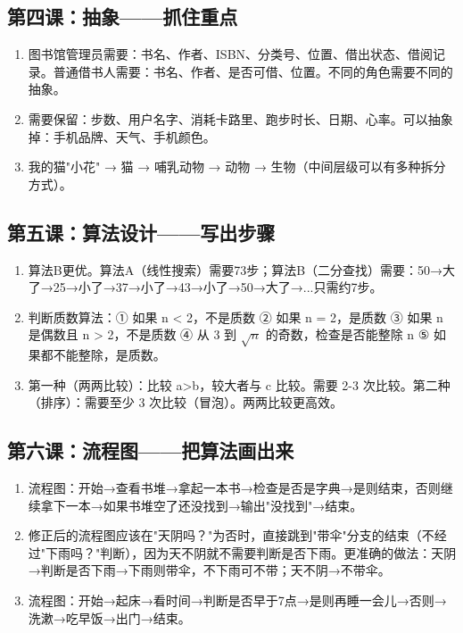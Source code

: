\documentclass[a4paper,12pt]{ctexart}
\begin{document}
\subsection*{第四课：抽象——抓住重点}
\begin{enumerate}
  \item 图书馆管理员需要：书名、作者、ISBN、分类号、位置、借出状态、借阅记录。普通借书人需要：书名、作者、是否可借、位置。不同的角色需要不同的抽象。
  \item 需要保留：步数、用户名字、消耗卡路里、跑步时长、日期、心率。可以抽象掉：手机品牌、天气、手机颜色。
  \item 我的猫"小花" → 猫 → 哺乳动物 → 动物 → 生物（中间层级可以有多种拆分方式）。
\end{enumerate}

\subsection*{第五课：算法设计——写出步骤}
\begin{enumerate}
  \item 算法B更优。算法A（线性搜索）需要73步；算法B（二分查找）需要：50→大了→25→小了→37→小了→43→小了→50→大了→...只需约7步。
  \item 判断质数算法：① 如果 n < 2，不是质数 ② 如果 n = 2，是质数 ③ 如果 n 是偶数且 n > 2，不是质数 ④ 从 3 到 $\sqrt{n}$ 的奇数，检查是否能整除 n ⑤ 如果都不能整除，是质数。
  \item 第一种（两两比较）：比较 a>b，较大者与 c 比较。需要 2-3 次比较。第二种（排序）：需要至少 3 次比较（冒泡）。两两比较更高效。
\end{enumerate}

\subsection*{第六课：流程图——把算法画出来}
\begin{enumerate}
  \item 流程图：开始→查看书堆→拿起一本书→检查是否是字典→是则结束，否则继续拿下一本→如果书堆空了还没找到→输出"没找到"→结束。
  \item 修正后的流程图应该在"天阴吗？"为否时，直接跳到"带伞"分支的结束（不经过"下雨吗？"判断），因为天不阴就不需要判断是否下雨。更准确的做法：天阴→判断是否下雨→下雨则带伞，不下雨可不带；天不阴→不带伞。
  \item 流程图：开始→起床→看时间→判断是否早于7点→是则再睡一会儿→否则→洗漱→吃早饭→出门→结束。
\end{enumerate}
\end{document}
